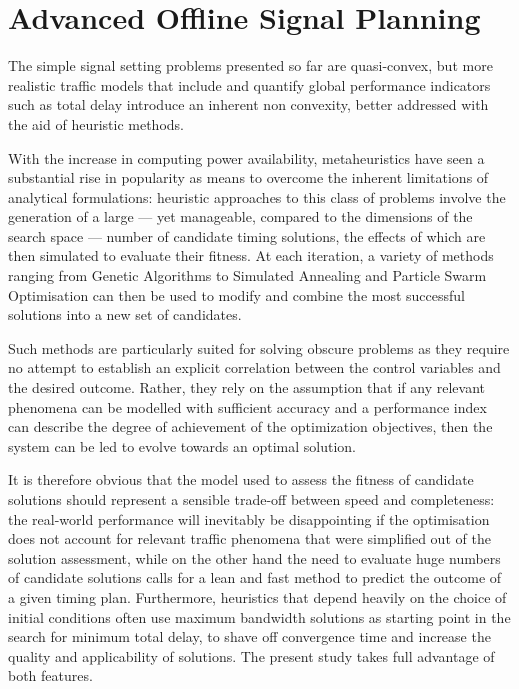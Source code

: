 \section{Advanced Offline Signal Planning}
The simple signal setting problems presented so far are quasi-convex, but more realistic traffic models that include and quantify global performance indicators such as total delay introduce an inherent non convexity, better addressed with the aid of heuristic methods.

With the increase in computing power availability, metaheuristics have seen a substantial rise in popularity as means to overcome the inherent limitations of analytical formulations: heuristic approaches to this class of problems involve the generation of a large — yet manageable, compared to the dimensions of the search space — number of candidate timing solutions, the effects of which are then simulated to evaluate their fitness. At each iteration, a variety of methods ranging from Genetic Algorithms to Simulated Annealing and Particle Swarm Optimisation can then be used to modify and combine the most successful solutions into a new set of candidates.

Such methods are particularly suited for solving obscure problems as they require no attempt to establish an explicit correlation between the control variables and the desired outcome. Rather, they rely on the assumption that if any relevant phenomena can be modelled with sufficient accuracy and a performance index can describe the degree of achievement of the optimization objectives, then the system can be led to evolve towards an optimal solution.


It is therefore obvious that the model used to assess the fitness of candidate solutions should represent a sensible trade-off between speed and completeness: the real-world performance will inevitably be disappointing if the optimisation does not account for relevant traffic phenomena that were simplified out of the solution assessment, while on the other hand the need to evaluate huge numbers of candidate solutions calls for a lean and fast method to predict the outcome of a given timing plan. Furthermore, heuristics that depend heavily on the choice of initial conditions often use maximum bandwidth solutions as starting point in the search for minimum total delay, to shave off convergence time and increase the quality and applicability of solutions.
The present study takes full advantage of both features.

